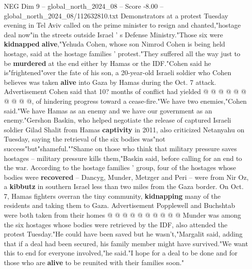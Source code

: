 \begin{textsample}{NEG Dim 9 – global\_north\_2024\_08 – Score -8.00 – global\_north\_2024\_08/112632810.txt}
Demonstrators at a protest Tuesday evening in Tel Aviv called on the prime minister to resign and chanted,"hostage deal now"in the streets outside Israel ' s Defense Ministry."Those six were \textbf{kidnapped} \textbf{alive},"Yehuda Cohen, whose son Nimrod Cohen is being held hostage, said at the hostage families ' protest."They suffered all the way just to be \textbf{murdered} at the end either by Hamas or the IDF."Cohen said he is"frightened"over the fate of his son, a 20-year-old Israeli soldier who Cohen believes was taken \textbf{alive} into Gaza by Hamas during the Oct. 7 attack.
Advertisement Cohen said that 10? months of conflict had yielded @ @ @ @ @ @ @ @ @ @, of hindering progress toward a cease-fire."We have two enemies,"Cohen said."We have Hamas as an enemy and we have our government as an enemy."Gershon Baskin, who helped negotiate the release of captured Israeli soldier Gilad Shalit from Hamas \textbf{captivity} in 2011, also criticized Netanyahu on Tuesday, saying the retrieval of the six bodies was"not success"but"shameful.""Shame on those who think that military pressure saves hostages -- military pressure kills them,"Baskin said, before calling for an end to the war.
According to the hostage families ' group, four of the hostages whose bodies were \textbf{recovered} -- Dancyg, Munder, Metzger and Peri -- were from Nir Oz, a \textbf{kibbutz} in southern Israel less than two miles from the Gaza border.
On Oct. 7, Hamas fighters overran the tiny community, \textbf{kidnapping} many of the residents and taking them to Gaza.
Advertisement Popplewell and Buchshtab were both taken from their homes @ @ @ @ @ @ @ @ @ @ Munder was among the six hostages whose bodies were retrieved by the IDF, also attended the protest Tuesday."He could have been saved but he wasn't,"Margalit said, adding that if a deal had been secured, his family member might have survived."We want this to end for everyone involved,"he said."I hope for a deal to be done and for those who are \textbf{alive} to be reunited with their families soon."

\end{textsample}
